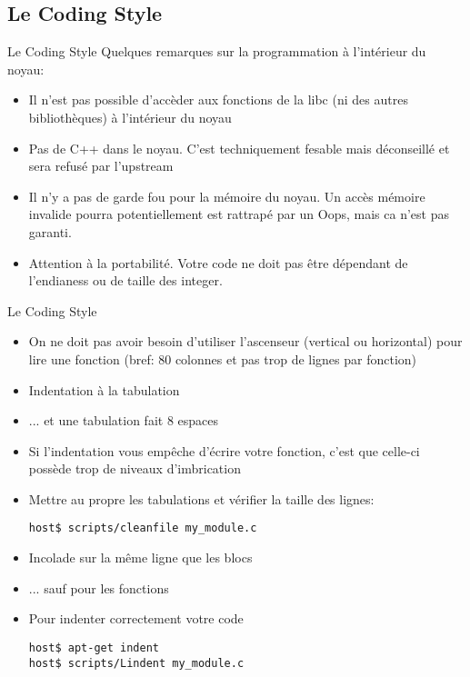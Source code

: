 \subsection{Le Coding Style}

\begin{frame}[fragile=singleslide]{Le Coding Style}
  Quelques remarques sur la programmation à l'intérieur du noyau:
  \begin{itemize} 
  \item Il n'est  pas possible d'accèder aux fonctions  de la libc (ni
    des autres bibliothèques) à l'intérieur du noyau
  \item Pas  de C++  dans le noyau.  C'est techniquement  fesable mais
    déconseillé et sera refusé par l'upstream
  \item Il n'y a  pas de garde fou pour la mémoire  du noyau. Un accès
    mémoire invalide pourra potentiellement  est rattrapé par un Oops,
    mais ca n'est pas garanti.
  \item  Attention à  la  portabilité.  Votre code  ne  doit pas  être
    dépendant de l'endianess ou de taille des integer.
  \end{itemize} 
\end{frame}

\begin{frame}[fragile=singleslide]{Le Coding Style}
  \begin{itemize} 
  \item On  ne doit pas avoir besoin  d'utiliser l'ascenseur (vertical
    ou horizontal)  pour lire une  fonction (bref: 80 colonnes  et pas
    trop de lignes par fonction)
  \item Indentation à la tabulation
  \item ... et une tabulation fait 8 espaces
  \item Si  l'indentation vous empêche d'écrire  votre fonction, c'est
    que celle-ci possède trop de niveaux d'imbrication
  \item Mettre  au propre  les tabulations et  vérifier la  taille des
    lignes:
    \begin{lstlisting} 
host$ scripts/cleanfile my_module.c
    \end{lstlisting} %
  \item Incolade sur la même ligne que les blocs
  \item ... sauf pour les fonctions
  \item  Pour indenter correctement votre code
    \begin{lstlisting}
host$ apt-get indent
host$ scripts/Lindent my_module.c
    \end{lstlisting} 
  \end{itemize}
\end{frame}

